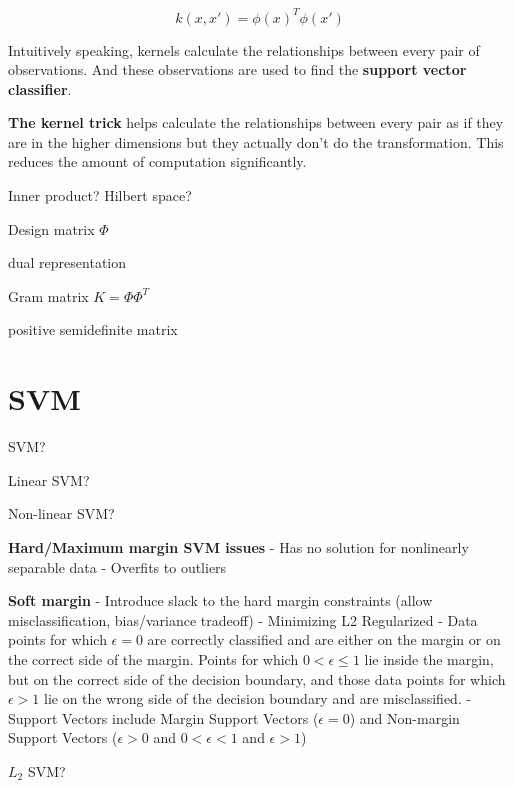 \documentclass[8pt,letterpaper]{book}
\begin{document}
$$
k(x,x') = \phi(x)^T \phi(x')
$$

Intuitively speaking, kernels calculate the relationships between every pair of 
observations. And these observations are used to find the 
\textbf{support vector classifier}. 

\textbf{The kernel trick} helps calculate the relationships between every pair 
as if they are in the higher dimensions but they actually don't do the 
transformation. This reduces the amount of computation significantly.

Inner product?
Hilbert space?

Design matrix $\Phi$

dual representation

Gram matrix $K = \Phi \Phi^T$

positive semidefinite matrix

\chapter{SVM}
SVM?

Linear SVM?

Non-linear SVM?

\textbf{Hard/Maximum margin SVM issues} \newline
- Has no solution for nonlinearly separable data \newline
- Overfits to outliers \newline

\textbf{Soft margin} \newline
- Introduce slack to the hard margin constraints (allow misclassification, 
bias/variance tradeoff) \newline
- Minimizing L2 Regularized \newline
- Data points for which $\epsilon = 0$ are correctly classified 
and are either on the margin or on the correct side of the margin. Points for which 
$0 < \epsilon \leq 1$ lie inside the margin, but on the correct side of the 
decision boundary, and those data points for which $\epsilon > 1$ lie on
the wrong side of the decision boundary and are misclassified.
- Support Vectors include Margin Support Vectors ($\epsilon = 0$) and 
Non-margin Support Vectors ($\epsilon > 0$ and $0 < \epsilon < 1$ and $\epsilon > 1$)

$L_2$ SVM?



\end{document}
